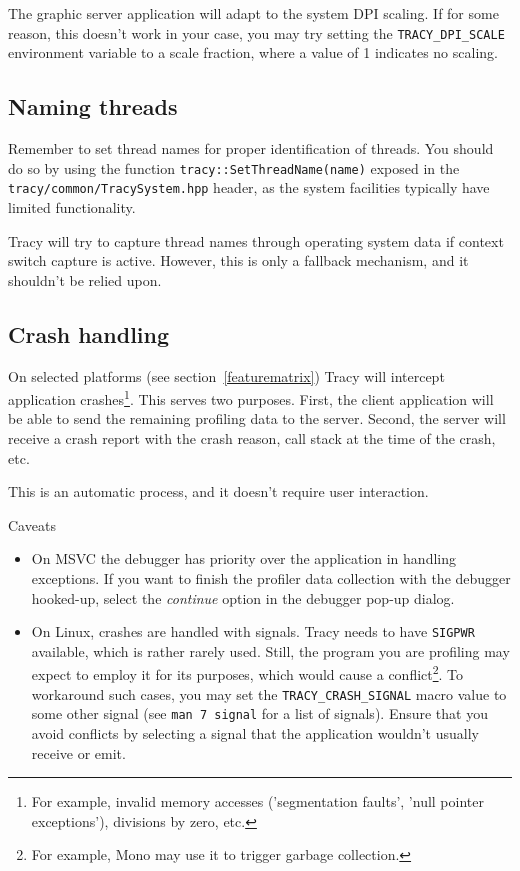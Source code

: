 \documentclass[hidelinks,titlepage,a4paper]{article}
\begin{document}
The graphic server application will adapt to the system DPI scaling. If for some reason, this doesn't work in your case, you may try setting the \texttt{TRACY\_DPI\_SCALE} environment variable to a scale fraction, where a value of 1 indicates no scaling.

\subsection{Naming threads}
\label{namingthreads}

Remember to set thread names for proper identification of threads. You should do so by using the function \texttt{tracy::SetThreadName(name)} exposed in the \texttt{tracy/common/TracySystem.hpp} header, as the system facilities typically have limited functionality.

Tracy will try to capture thread names through operating system data if context switch capture is active. However, this is only a fallback mechanism, and it shouldn't be relied upon.

\subsection{Crash handling}
\label{crashhandling}

On selected platforms (see section~\ref{featurematrix}) Tracy will intercept application crashes\footnote{For example, invalid memory accesses ('segmentation faults', 'null pointer exceptions'), divisions by zero, etc.}. This serves two purposes. First, the client application will be able to send the remaining profiling data to the server. Second, the server will receive a crash report with the crash reason, call stack at the time of the crash, etc.

This is an automatic process, and it doesn't require user interaction.

\begin{bclogo}[
noborder=true,
couleur=black!5,
logo=\bcattention
]{Caveats}
\begin{itemize}
\item On MSVC the debugger has priority over the application in handling exceptions. If you want to finish the profiler data collection with the debugger hooked-up, select the \emph{continue} option in the debugger pop-up dialog.
\item On Linux, crashes are handled with signals. Tracy needs to have \texttt{SIGPWR} available, which is rather rarely used. Still, the program you are profiling may expect to employ it for its purposes, which would cause a conflict\footnote{For example, Mono may use it to trigger garbage collection.}. To workaround such cases, you may set the \texttt{TRACY\_CRASH\_SIGNAL} macro value to some other signal (see \texttt{man 7 signal} for a list of signals). Ensure that you avoid conflicts by selecting a signal that the application wouldn't usually receive or emit.
\end{itemize}
\end{bclogo}
\end{document}
